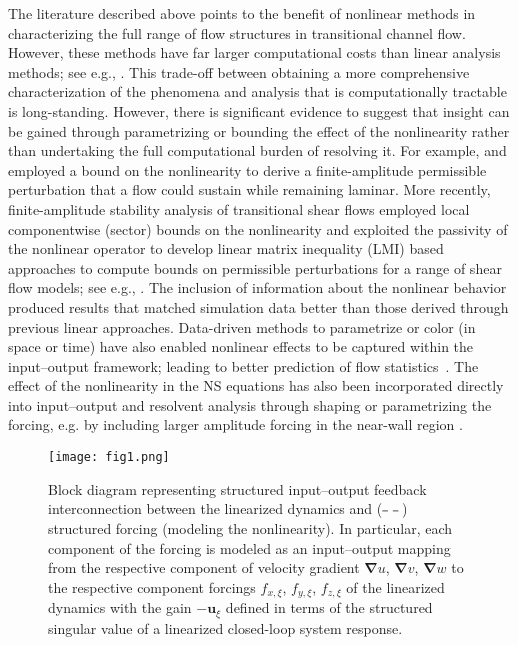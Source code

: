 The literature described above points to the benefit of nonlinear methods in characterizing the full range of flow structures in transitional channel flow. However, these methods have far larger computational costs than linear analysis methods; see e.g., \citep{Kerswell2014,Kerswell2018}. This trade-off between obtaining a more comprehensive characterization of the phenomena and analysis that is computationally tractable is long-standing. However, there is significant evidence to suggest that insight can be gained through parametrizing or bounding the effect of the nonlinearity rather than undertaking the full computational burden of resolving it. For example, \citet{kreiss1994bounds} and \citet{chapman2002subcritical} employed a bound on the nonlinearity to derive a finite-amplitude permissible perturbation that a flow could sustain while remaining laminar. More recently, finite-amplitude stability analysis of transitional shear flows employed local componentwise (sector) bounds on the nonlinearity and exploited the passivity of the nonlinear operator to develop linear matrix inequality (LMI) based approaches to compute bounds on permissible perturbations for a range of shear flow models; see e.g., \citet{kalur2020nonlinear,kalur2020stability,kalur2021estimating,liu2020input}. The inclusion of information about the nonlinear behavior produced results that matched simulation data better than those derived through previous linear approaches. Data-driven methods to parametrize or color (in space or time)    have also enabled nonlinear effects to be captured within the input--output framework; leading to better prediction of flow statistics~\citep{chevalier2006state,Zare2017,morra2021color,nogueira2021forcing}. The effect of the nonlinearity in the NS equations has also been incorporated directly into input--output and resolvent analysis through shaping or parametrizing the forcing, e.g. by including larger amplitude forcing in the near-wall region \citep{jovanovic2001modeling,Hpffner2005}. 

\begin{figure}


    \centering
    \texttt{[image: fig1.png]}
    \caption{Block diagram representing  structured input--output feedback interconnection between the linearized dynamics and ({\color{blue}$\dashed$}) structured forcing (modeling the nonlinearity). In particular, each component of the forcing is modeled as an input--output mapping from the respective  component of velocity gradient $\boldsymbol{\nabla} u$, $\boldsymbol{\nabla} v$, $\boldsymbol{\nabla} w$ to the respective component forcings $f_{x,\xi}$, $f_{y,\xi}$, $f_{z,\xi}$ of the linearized dynamics with the gain $-\boldsymbol{u}_{\xi}$ defined in terms of the structured singular value of a linearized closed-loop system  response. }
    \label{fig:feedback_introduction}
\end{figure}


